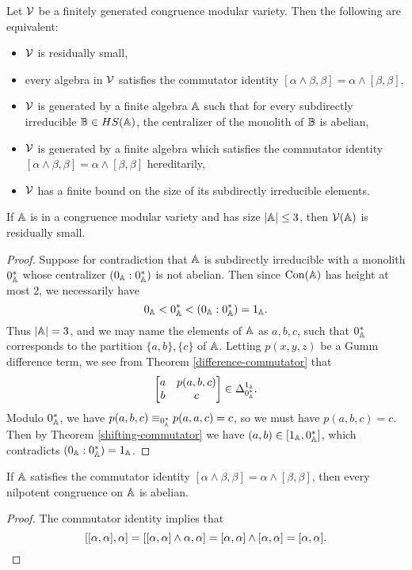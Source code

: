 \begin{appendices}
\begin{cor}\label{residual-crit} Let $\mathcal{V}$ be a finitely generated congruence modular variety. Then the following are equivalent:
\begin{itemize}
\item $\mathcal{V}$ is residually small,

\item every algebra in $\mathcal{V}$ satisfies the commutator identity $[\alpha \wedge \beta, \beta] = \alpha \wedge [\beta,\beta]$,

\item $\mathcal{V}$ is generated by a finite algebra $\mathbb{A}$ such that for every subdirectly irreducible $\mathbb{B} \in HS(\mathbb{A})$, the centralizer of the monolith of $\mathbb{B}$ is abelian,

\item $\mathcal{V}$ is generated by a finite algebra which satisfies the commutator identity $[\alpha \wedge \beta, \beta] = \alpha \wedge [\beta,\beta]$ hereditarily,

\item $\mathcal{V}$ has a finite bound on the size of its subdirectly irreducible elements.
\end{itemize}
\end{cor}

\begin{cor} If $\mathbb{A}$ is in a congruence modular variety and has size $|\mathbb{A}| \le 3$, then $\mathcal{V}(\mathbb{A})$ is residually small.
\end{cor}
\begin{proof} Suppose for contradiction that $\mathbb{A}$ is subdirectly irreducible with a monolith $0_{\mathbb{A}}^*$ whose centralizer $(0_{\mathbb{A}} : 0_{\mathbb{A}}^*)$ is not abelian. Then since $\operatorname{Con}(\mathbb{A})$ has height at most $2$, we necessarily have
\[
0_{\mathbb{A}} < 0_{\mathbb{A}}^* < (0_{\mathbb{A}} : 0_{\mathbb{A}}^*) = 1_{\mathbb{A}}.
\]
Thus $|\mathbb{A}| = 3$, and we may name the elements of $\mathbb{A}$ as $a,b,c$, such that $0_{\mathbb{A}}^*$ corresponds to the partition $\{a,b\},\{c\}$ of $\mathbb{A}$. Letting $p(x,y,z)$ be a Gumm difference term, we see from Theorem \ref{difference-commutator} that
\[
\begin{bmatrix} a & p(a,b,c)\\ b & c\end{bmatrix} \in \Delta_{0_{\mathbb{A}}^*}^{1_{\mathbb{A}}}.
\]
Modulo $0_{\mathbb{A}}^*$, we have $p(a,b,c) \equiv_{0_{\mathbb{A}}^*} p(a,a,c) = c$, so we must have $p(a,b,c) = c$. Then by Theorem \ref{shifting-commutator} we have $(a,b) \in [1_{\mathbb{A}}, 0_{\mathbb{A}}^*]$, which contradicts $(0_{\mathbb{A}} : 0_{\mathbb{A}}^*) = 1_{\mathbb{A}}$.
\end{proof}

\begin{prop}\label{residual-nilpotent} If $\mathbb{A}$ satisfies the commutator identity $[\alpha\wedge \beta,\beta] = \alpha \wedge [\beta,\beta]$, then every nilpotent congruence on $\mathbb{A}$ is abelian.
\end{prop}
\begin{proof} The commutator identity implies that
\[
[[\alpha,\alpha],\alpha] = [[\alpha,\alpha] \wedge \alpha,\alpha] = [\alpha,\alpha]\wedge[\alpha,\alpha] = [\alpha,\alpha].\qedhere
\]
\end{proof}


\end{appendices}
